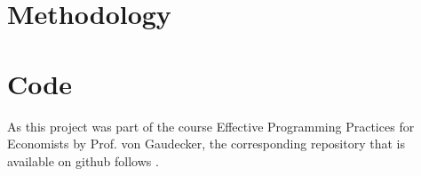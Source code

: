 \documentclass[11pt, a4paper, leqno]{article}
\begin{document}
\section{Methodology}

\section{Code}
As this project was part of the course Effective Programming Practices for Economists by Prof. von Gaudecker, the corresponding repository 
that is available on github follows \citet{GaudeckerEconProjectTemplates}.





\printbibliography
{}





\end{document}
